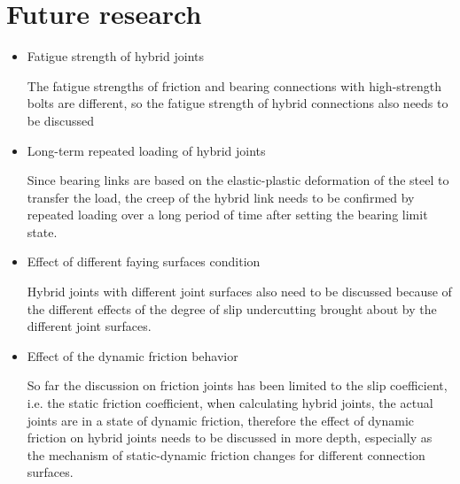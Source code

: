 \section*{Future research}

\begin{itemize}

\renewcommand\labelitemi{\faSearch}

\item Fatigue strength of hybrid joints

The fatigue strengths of friction and bearing connections with high-strength bolts are different, so the fatigue strength of hybrid connections also needs to be discussed

\item Long-term repeated loading of hybrid joints

Since bearing links are based on the elastic-plastic deformation of the steel to transfer the load, the creep of the hybrid link needs to be confirmed by repeated loading over a long period of time after setting the bearing limit state.

\item Effect of different faying surfaces condition

Hybrid joints with different joint surfaces also need to be discussed because of the different effects of the degree of slip undercutting brought about by the different joint surfaces.

\item Effect of the dynamic friction behavior

So far the discussion on friction joints has been limited to the slip coefficient, i.e. the static friction coefficient, when calculating hybrid joints, the actual joints are in a state of dynamic friction, therefore the effect of dynamic friction on hybrid joints needs to be discussed in more depth, especially as the mechanism of static-dynamic friction changes for different connection surfaces.
    
\end{itemize}
